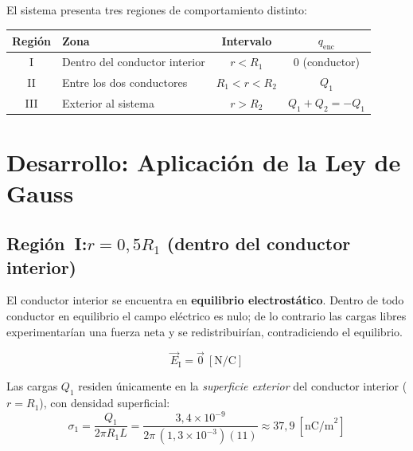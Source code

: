 \documentclass[12pt,letterpaper]{article}
\begin{document}
El sistema presenta tres regiones de comportamiento distinto:

\begin{center}
\renewcommand{\arraystretch}{1.30}
\begin{tabular}{clcc}
\hline
\textbf{Regi\'on} & \textbf{Zona} & \textbf{Intervalo} & \textbf{$q_\text{enc}$} \\
\hline
I   & Dentro del conductor interior & $r < R_1$       & $0$ (conductor) \\
II  & Entre los dos conductores     & $R_1 < r < R_2$ & $Q_1$ \\
III & Exterior al sistema           & $r > R_2$       & $Q_1 + Q_2 = -Q_1$ \\
\hline
\end{tabular}
\end{center}

\section*{Desarrollo: Aplicaci\'on de la Ley de Gauss}

\subsection*{Regi\'on~I:\enspace $r = 0{,}5R_1$ \normalfont(dentro del conductor interior)}

\noindent
\begin{minipage}[c]{0.30\textwidth}
\centering
{}
\end{minipage}%
\hfill
\begin{minipage}[c]{0.67\textwidth}
El conductor interior se encuentra en \textbf{equilibrio electrost\'atico}.
Dentro de todo conductor en equilibrio el campo el\'ectrico es nulo;
de lo contrario las cargas libres experimentar\'ian una fuerza neta y se
redistribuir\'ian, contradiciendo el equilibrio.

\[
    \boxed{\vec{E}_\text{I} = \vec{0}\ [\text{N/C}]}
\]

Las cargas $Q_1$ residen \'unicamente en la \emph{superficie exterior}
del conductor interior ($r = R_1$), con densidad superficial:
\[
    \sigma_1 = \frac{Q_1}{2\pi R_1 L}
    = \frac{3{,}4\times10^{-9}}{2\pi\,(1{,}3\times10^{-3})(11)}
    \approx 37{,}9\ [\text{nC/m}^2]
\]
\end{minipage}
\end{document}
